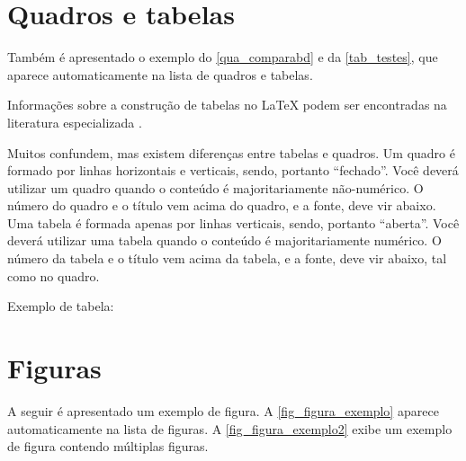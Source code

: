 \begin{apendicesenv}
    \newpage

    \section{Quadros e tabelas}
    \label{sec_tabelas}

    Também é apresentado o exemplo do \autoref{qua_comparabd} e da \autoref{tab_testes}, que aparece automaticamente na lista de quadros e tabelas.

    Informações sobre a construção de tabelas no \LaTeX{} podem ser encontradas na literatura especializada \cite{Lamport1986,Buerger1989,Kopka2003,Mittelbach2004}.

    

    Muitos confundem, mas existem diferenças entre  tabelas e  quadros.
    Um quadro é formado por linhas horizontais e verticais, sendo, portanto ``fechado''.
    Você deverá utilizar um quadro quando o conteúdo é majoritariamente não-numérico.
    O número do quadro e o título vem acima do quadro, e a fonte, deve vir abaixo.
    Uma tabela é formada apenas por linhas verticais, sendo, portanto ``aberta''.
    Você deverá utilizar uma tabela quando o conteúdo é majoritariamente numérico.
    O número da tabela e o título vem acima da tabela, e a fonte, deve vir abaixo, tal como no quadro.

    Exemplo de tabela:

    

    \newpage

    \section{Figuras}
    \label{sec_figuras}

    A seguir é apresentado um exemplo de figura.
    A \autoref{fig_figura_exemplo} aparece automaticamente na lista de figuras.
    A \autoref{fig_figura_exemplo2} exibe um exemplo de figura contendo múltiplas figuras.


\end{apendicesenv}
